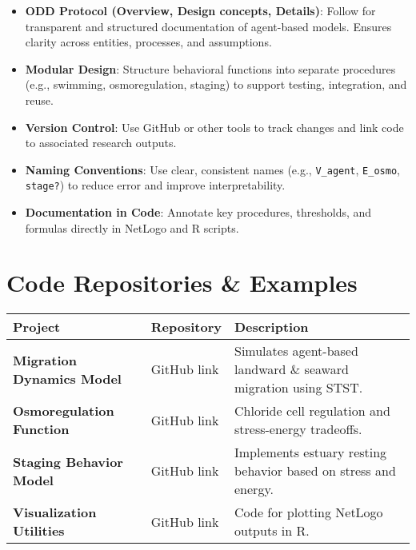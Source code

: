 \documentclass[
]{book}
\begin{document}
\begin{itemize}
\item
  \textbf{ODD Protocol (Overview, Design concepts, Details)}: Follow for transparent and structured documentation of agent-based models. Ensures clarity across entities, processes, and assumptions.
\item
  \textbf{Modular Design}: Structure behavioral functions into separate procedures (e.g., swimming, osmoregulation, staging) to support testing, integration, and reuse.
\item
  \textbf{Version Control}: Use GitHub or other tools to track changes and link code to associated research outputs.
\item
  \textbf{Naming Conventions}: Use clear, consistent names (e.g., \texttt{V\_agent}, \texttt{E\_osmo}, \texttt{stage?}) to reduce error and improve interpretability.
\item
  \textbf{Documentation in Code}: Annotate key procedures, thresholds, and formulas directly in NetLogo and R scripts.
\end{itemize}

\section{Code Repositories \& Examples}\label{code-repositories-examples}

\begin{longtable}[]{@{}
  >{\raggedright\arraybackslash}p{}
  >{\raggedright\arraybackslash}p{}
  >{\raggedright\arraybackslash}p{}@{}}
\toprule\noalign{}
\begin{minipage}[b]{\linewidth}\raggedright
Project
\end{minipage} & \begin{minipage}[b]{\linewidth}\raggedright
Repository
\end{minipage} & \begin{minipage}[b]{\linewidth}\raggedright
Description
\end{minipage} \\
\midrule\noalign{}
\endhead
\bottomrule\noalign{}
\endlastfoot
\textbf{Migration Dynamics Model} & GitHub link & Simulates agent-based landward \& seaward migration using STST. \\
\textbf{Osmoregulation Function} & GitHub link & Chloride cell regulation and stress-energy tradeoffs. \\
\textbf{Staging Behavior Model} & GitHub link & Implements estuary resting behavior based on stress and energy. \\
\textbf{Visualization Utilities} & GitHub link & Code for plotting NetLogo outputs in R. \\
\end{longtable}
\end{document}

